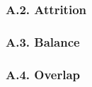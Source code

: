 \FloatBarrier

\subsubsection*{A.2. Attrition}\label{app:attrition}



\FloatBarrier

\subsubsection*{A.3. Balance}\label{app:balance}


\FloatBarrier

\subsubsection*{A.4. Overlap}\label{app:overlap}


